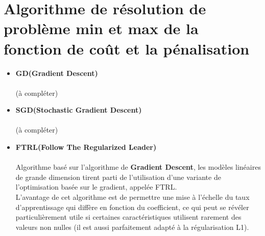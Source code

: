 \documentclass[french]{article}
\begin{document}
	\section{Algorithme de résolution de problème min et max de la fonction de coût et la pénalisation}
	\begin{itemize}[label=\textbullet, font=\LARGE \color{red}]
	\item \textbf{GD(Gradient Descent)}\\\\
	(à compléter)\\
	\item \textbf{SGD(Stochastic Gradient Descent)}\\\\
	(à compléter)\\
    \item \textbf{FTRL(Follow The Regularized Leader)}\\\\
    Algorithme basé sur l'algorithme de \textbf{Gradient Descent}, les modèles linéaires de grande dimension tirent parti de l'utilisation d'une variante de l'optimisation basée sur le gradient, appelée FTRL. \\
    L'avantage de cet algorithme est de permettre une mise à l'échelle du taux d'apprentissage qui diffère en fonction du coefficient, ce qui peut se révéler particulièrement utile si certaines caractéristiques utilisent rarement des valeurs non nulles (il est aussi parfaitement adapté à la régularisation L1).
    \end{itemize}
    
\end{document}
